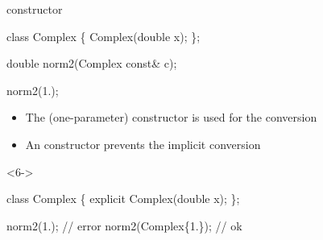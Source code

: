 \begin{frame}[fragile]{ constructor}

  \begin{codeblock}
class Complex \{
  \ddd
  Complex(double x);
\};

double norm2(Complex const& c);

norm2(1.);
\end{codeblock}

  \begin{itemize}
  \item<2-> The (one-parameter) constructor is used for the conversion
  \item<6-> An  constructor prevents the implicit conversion
  \end{itemize}

  \begin{codeblock}<6->{
class Complex \{
  \ddd
  \alert{explicit} Complex(double x);
\};

norm2(1.);          // error
norm2(Complex\{1.\}); // ok}\end{codeblock}

\end{frame}

